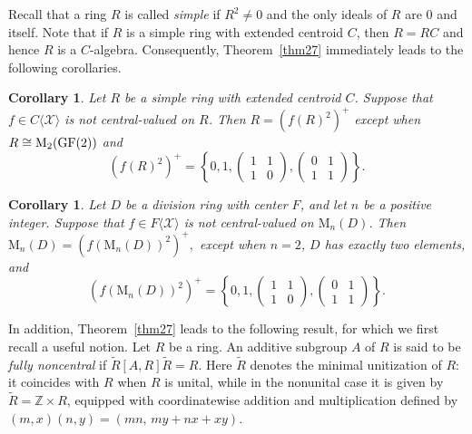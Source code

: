 \documentclass[11pt]{article}
\newtheorem{corollary}[theorem]{Corollary}
\theoremstyle{definition}
\begin{document}
{{{{				Recall that a ring $R$ is called \textit{simple} if $R^2 \neq 0$ and the only ideals of $R$ are $0$ and itself. Note that if $R$ is a simple ring with extended centroid $C$, then $R=RC$ and hence $R$ is a $C$-algebra. Consequently, Theorem~\ref{thm27} immediately leads to the following corollaries.
				
				\begin{corollary}\label{cor21}
					Let $R$ be a simple ring with extended centroid $C$. Suppose that $f \in C\langle \mathcal{X}\rangle$ is not central-valued on $R$. Then
$R = (f(R)^2)^+$ except when $R \cong \text{\rm M}_2(\text{\rm GF}(2))$ and
					$$
					(f(R)^2)^+ =\left\{0, 1, \begin{pmatrix}
						1 & 1 \\
						1 & 0
					\end{pmatrix}, \begin{pmatrix}
						0 & 1 \\
						1 & 1
					\end{pmatrix}\right\}.
					$$
				\end{corollary}
				
				\begin{corollary}\label{cor22}
					Let $D$ be a division ring with center $F$, and let $n$ be a positive integer. Suppose that $f \in F\langle \mathcal{X} \rangle$ is not central-valued on $\mathrm{M}_n(D)$. Then $\mathrm{M}_n(D) = (f(\mathrm{M}_n(D))^2)^+,$
					except when $n=2$, $D$ has exactly two elements, and
					$$
					(f(\mathrm{M}_n(D))^2)^+
					=\left\{0, 1, \begin{pmatrix}
						1 & 1 \\
						1 & 0
					\end{pmatrix}, \begin{pmatrix}
						0 & 1 \\
						1 & 1
					\end{pmatrix}\right\}.
					$$
				\end{corollary}
				
				In addition, Theorem~\ref{thm27} leads to the following result, for which we first recall a useful notion. Let $R$ be a ring. An additive subgroup $A$ of $R$ is said to be \textit{fully noncentral} if $\widetilde{R}[A,R]\widetilde{R}=R$. Here $\widetilde{R}$ denotes the minimal unitization of $R$: it coincides with $R$ when $R$ is unital, while in the nonunital case it is given by $\widetilde{R}=\mathbb{Z}\times R$, equipped with coordinatewise addition and multiplication defined by $(m,x)(n,y)=(mn,\, my+nx+xy).$
				
}}}}
\end{document}
